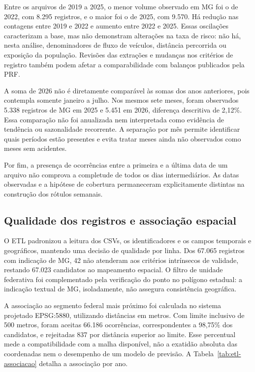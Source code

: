 \documentclass[12pt]{article}
\begin{document}
Entre os arquivos de 2019 a 2025, o menor volume observado em MG foi o
de 2022, com 8.295 registros, e o maior foi o de 2025, com 9.570.
Há redução nas contagens entre 2019 e 2022 e aumento entre 2022 e 2025.
Essas oscilações caracterizam a base, mas não demonstram alterações na
taxa de risco: não há, nesta análise, denominadores de fluxo de
veículos, distância percorrida ou exposição da população. Revisões das
extrações e mudanças nos critérios de registro também podem afetar a
comparabilidade com balanços publicados pela PRF.

A soma de 2026 não é diretamente comparável às somas dos anos
anteriores, pois contempla somente janeiro a julho. Nos mesmos sete
meses, foram observados 5.338 registros de MG em 2025 e 5.451 em 2026,
diferença descritiva de 2,12\%. Essa comparação não foi anualizada nem
interpretada como evidência de tendência ou sazonalidade recorrente.
A separação por mês permite identificar quais períodos estão presentes
e evita tratar meses ainda não observados como meses sem acidentes.

Por fim, a presença de ocorrências entre a primeira e a última data de
um arquivo não comprova a completude de todos os dias intermediários.
As datas observadas e a hipótese de cobertura permaneceram
explicitamente distintas na construção dos rótulos semanais.

\clearpage
\subsection{Qualidade dos registros e associação espacial}

O ETL padronizou a leitura dos CSVs, os identificadores e os campos
temporais e geográficos, mantendo uma decisão de qualidade por linha.
Dos 67.065 registros com indicação de MG, 42 não atenderam aos critérios
intrínsecos de validade, restando 67.023 candidatos ao mapeamento
espacial. O filtro de unidade federativa foi complementado pela
verificação do ponto no polígono estadual: a indicação textual de MG,
isoladamente, não assegura consistência geográfica.

A associação ao segmento federal mais próximo foi calculada no sistema
projetado EPSG:5880, utilizando distâncias em metros. Com limite
inclusivo de 500 metros, foram aceitas 66.186 ocorrências, correspondentes
a 98,75\% dos candidatos, e rejeitadas 837 por distância superior ao
limite. Esse percentual mede a compatibilidade com a malha disponível,
não a exatidão absoluta das coordenadas nem o desempenho de um modelo
de previsão. A Tabela~\ref{tab:etl-associacao} detalha a associação por ano.
\end{document}
